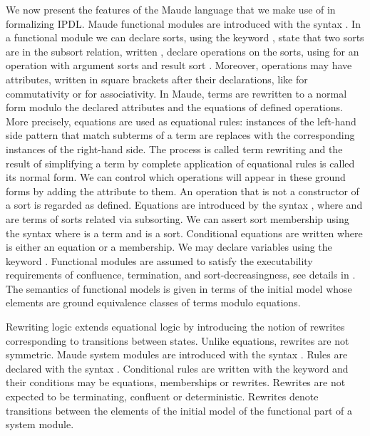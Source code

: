 We now present the features of the Maude language that we make use of
in formalizing \textsf{IPDL}.
Maude functional modules are introduced with the syntax
. In a functional module we can declare
sorts, using the keyword , state that two sorts are
in the subsort relation, written , declare
operations on the sorts, using  for 
an operation  with argument sorts  and 
result sort . Moreover, operations
may have attributes, written in square brackets after their declarations,
like  for commutativity or  for associativity.
In Maude, terms are rewritten to a normal form modulo the declared 
attributes and the equations of defined operations.
More precisely, 
equations are used as equational rules: instances of the left-hand side
pattern that match subterms of a term are replaces with the 
corresponding instances of the right-hand side.
The process is called term rewriting and the result of simplifying a term by complete application of equational rules is called its normal form. 
We can control which operations will appear in these ground
forms by adding the attribute  to them. An operation that
is not a constructor of a sort is regarded as defined. 
Equations are introduced by the syntax 
, where  and  are terms
of sorts related via subsorting. 
We can assert sort membership using the syntax 
where  is a term and  is a sort.
Conditional equations are written
where  is either an equation or a membership.
We may declare variables using the keyword .
Functional modules are assumed to satisfy the executability requirements of confluence,
termination, and sort-decreasingness, see details
in \cite{DBLP:conf/maude/2007}.
The semantics of functional models is given in terms of the initial
model whose elements are ground equivalence classes of terms modulo
equations.

Rewriting logic extends equational logic by introducing the notion of rewrites corresponding to transitions between states.
Unlike equations, rewrites are not symmetric. Maude system modules
are introduced with the syntax . Rules
are declared with the syntax 
. 
Conditional rules are written with the keyword
and their conditions
 may be equations, memberships or rewrites. 
Rewrites are not expected to be terminating, confluent or deterministic.
Rewrites denote transitions between the elements of the initial model
of the functional part of a system module.

